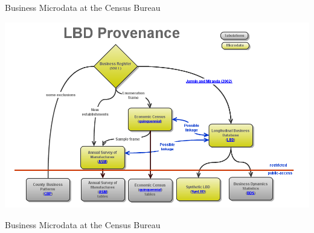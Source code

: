 \begin{frame}{Business Microdata at the Census Bureau}
\begin{center}
\includegraphics[height=0.8\textheight]{./LBD_Provenance_v2}
\end{center}
\end{frame}

\begin{frame}{Business Microdata at the Census Bureau}
\pause
{}
\end{frame}





